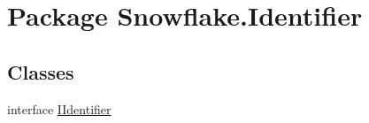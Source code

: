 \hypertarget{namespace_snowflake_1_1_identifier}{}\section{Package Snowflake.\+Identifier}
\label{namespace_snowflake_1_1_identifier}
\subsection*{Classes}
\begin{DoxyCompactItemize}
\item 
interface \hyperlink{interface_snowflake_1_1_identifier_1_1_i_identifier}{I\+Identifier}
\end{DoxyCompactItemize}
